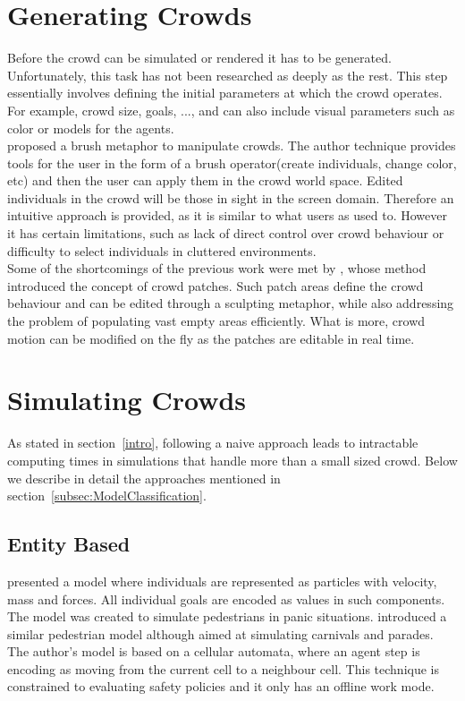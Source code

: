 \documentclass[6pt]{article} %
\begin{document}
\begin{multicols}{2}
\section{Generating Crowds}

Before the crowd can be simulated or rendered it has to be generated.
Unfortunately, this task has not been researched as deeply as the rest.
This step essentially involves defining the initial parameters at which the crowd operates.
For example, crowd size, goals, ..., and can also include visual parameters such as color or models for the agents.\\

\cite{Ulicny2004} proposed a brush metaphor to manipulate crowds.
The author technique provides tools for the user in the form of a brush operator(create individuals, change color, etc) and then the user can apply them in the crowd world space.
Edited individuals in the crowd will be those in sight in the screen domain.
Therefore an intuitive approach is provided, as it is similar to what users as used to.
However it has certain limitations, such as lack of direct control over crowd behaviour or difficulty to select individuals in cluttered environments.\\

Some of the shortcomings of the previous work were met by \cite{Jordao2014}, whose method introduced the concept of crowd patches.
Such patch areas define the crowd behaviour and can be edited through a sculpting metaphor, while also addressing the problem of populating vast empty areas efficiently.
What is more, crowd motion can be modified on the fly as the patches are editable in real time.

\section{Simulating Crowds}

As stated in section~\ref{intro}, following a naive approach leads to intractable computing times in simulations that handle more than a small sized crowd.
Below we describe in detail the approaches mentioned in section~\ref{subsec:ModelClassification}. 

\subsection{Entity Based}

\cite{Helbing2000} presented a model where individuals are represented as particles with velocity, mass and forces.
All individual goals are encoded as values in such components.
The model was created to simulate pedestrians in panic situations.
\cite{batty2003} introduced a similar pedestrian model although aimed at simulating carnivals and parades.
The author's model is based on a cellular automata, where an agent step is encoding as moving from the current cell to a neighbour cell.
This technique is constrained to evaluating safety policies and it only has an offline work mode.


\end{multicols}
\end{document}
